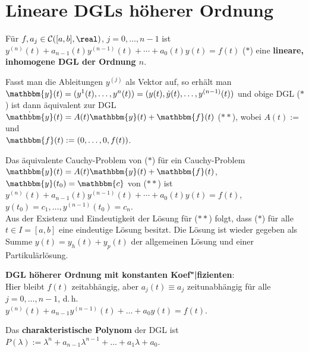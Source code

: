 \section{%
    Lineare DGLs höherer Ordnung%
}

Für $f, a_j \in \C([a, b], \real)$, $j = 0, \dotsc, n - 1$ ist
$y^{(n)}(t) + a_{n-1}(t) y^{(n-1)}(t) + \dotsb + a_0(t) y(t) = f(t)$ ($\ast$)
eine \textbf{lineare, inhomogene DGL der Ordnung $n$}.

Fasst man die Ableitungen $y^{(j)}$ als Vektor auf, so erhält man \\
$\mathbbm{y}(t) = (y^1(t), \dotsc, y^n(t)) =
(y(t), \dot{y}(t), \dotsc, y^{(n-1)}(t))$
und obige DGL ($\ast$) ist dann äquivalent zur DGL
$\dot{\mathbbm{y}}(t) = A(t) \mathbbm{y}(t) + \mathbbm{f}(t)$ ($\ast\ast$),
wobei $A(t) := $  und \\
$\mathbbm{f}(t) := (0, \dotsc, 0, f(t))$.

Das äquivalente Cauchy-Problem von ($\ast$) für ein Cauchy-Problem \\
$\dot{\mathbbm{y}}(t) = A(t) \mathbbm{y}(t) + \mathbbm{f}(t)$,
$\mathbbm{y}(t_0) = \mathbbm{c}$ von ($\ast\ast$) ist \\
$y^{(n)}(t) + a_{n-1}(t) y^{(n-1)}(t) + \dotsb + a_0(t) y(t) = f(t)$,
$y(t_0) = c_1, \dotsc, y^{(n-1)}(t_0) = c_n$. \\
Aus der Existenz und Eindeutigkeit der Lösung für ($\ast\ast$) folgt,
dass ($\ast$) für alle $t \in I = [a, b]$ eine eindeutige Lösung besitzt.
Die Lösung ist wieder gegeben als Summe
$y(t) = y_h(t) + y_p(t)$
der allgemeinen Lösung und einer Partikulärlösung.

\linie

\textbf{DGL höherer Ordnung mit konstanten Koef"|fizienten}: \\
Hier bleibt $f(t)$ zeitabhängig, aber $a_j(t) \equiv a_j$ zeitunabhängig
für alle $j = 0, \dotsc, n - 1$, d.\,h. \\
$y^{(n)}(t) + a_{n-1} y^{(n-1)}(t) + \dotsc + a_0 y(t) = f(t)$.

Das \textbf{charakteristische Polynom} der DGL ist
$P(\lambda) := \lambda^n + a_{n-1} \lambda^{n-1} + \dotsc + a_1 \lambda + a_0$.

